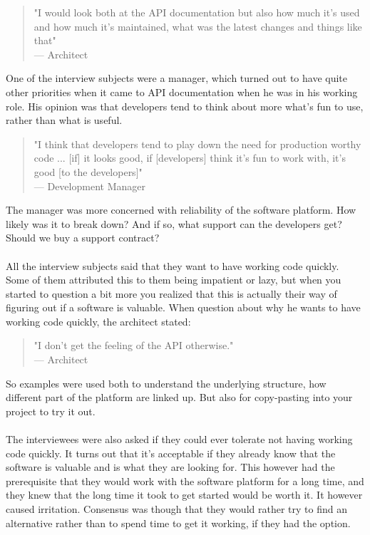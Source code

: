 \documentclass{cslthse-msc}
\begin{document}
    \begin{quote}
        "I would look both at the API documentation but also how much it's used and how much it's maintained, what was the latest changes and things like that" \\
        --- Architect
    \end{quote}
    One of the interview subjects were a manager, which turned out to have quite other priorities when it came to API documentation when he was in his working role. His opinion was that developers tend to think about more what's fun to use, rather than what is useful.
    \begin{quote}
        "I think that developers tend to play down the need for production worthy code ... [if] it looks good, if [developers] think it's fun to work with, it's good [to the developers]" \\
        --- Development Manager
    \end{quote}
    The manager was more concerned with reliability of the software platform. How likely was it to break down? And if so, what support can the developers get? Should we buy a support contract?
    \\ \\
    All the interview subjects said that they want to have working code quickly. Some of them attributed this to them being impatient or lazy, but when you started to question a bit more you realized that this is actually their way of figuring out if a software is valuable. When question about why he wants to have working code quickly, the architect stated:
    \begin{quote}
        "I don't get the feeling of the API otherwise." \\
        --- Architect
    \end{quote}
    So examples were used both to understand the underlying structure, how different part of the platform are linked up. But also for copy-pasting into your project to try it out.
    \\ \\
    The interviewees were also asked if they could ever tolerate not having working code quickly. It turns out that it's acceptable if they already know that the software is valuable and is what they are looking for. This however had the prerequisite that they would work with the software platform for a long time, and they knew that the long time it took to get started would be worth it. It however caused irritation. Consensus was though that they would rather try to find an alternative rather than to spend time to get it working, if they had the option.
\end{document}
